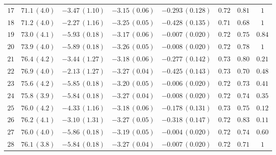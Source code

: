 \begin{center}
\begin{longtable}{@{\extracolsep{\fill}}cccccccc@{}}

$17$ &$ 71.1\,(4.0)$ & $-3.47\,(1.10)$& $-3.15\,(0.06)$& $-0.293\,(0.128)$ & $ 0.72 $ & $ 0.81 $ & $1 $ \\

$18$ &$ 71.2\,(4.0)$ & $-2.27\,(1.16)$& $-3.25\,(0.05)$& $-0.428\,(0.135)$ & $ 0.71 $ & $ 0.68 $ & $ 1$ \\

$19$ &$73.0\,(4.1)$ & $-5.93\,(0.18)$& $-3.17\,(0.06)$& $-0.007\,(0.020)$ & $ 0.72 $ & $ 0.75 $ & $ 0.84 $ \\

$20$ &$73.9\,(4.0)$ & $-5.89\,(0.18)$& $-3.26\,(0.05)$& $-0.008\,(0.020)$ & $ 0.72 $ & $ 0.78$ & $1 $ \\


$21$ & $76.4\,(4.2)$&$-3.44\,(1.27)$ &$-3.18\,(0.06) $ &$-0.277\,(0.142) $ & $ 0.73 $ & $ 0.80 $ & $ 0.21 $\\
 
$22$ & $76.9\,(4.0)$&$-2.13\,(1.27)$ &$-3.27\,(0.04) $ &$-0.425\,(0.143) $ & $ 0.73 $ & $ 0.70 $ & $ 0.48 $\\
 
$23$ &$75.6\,(4.2)$ &$-5.85\,(0.18)$ &$-3.20\,(0.05) $ &$-0.006\,(0.020) $ & $ 0.72 $ & $ 0.73 $ & $ 0.41 $\\

$24$ &$75.8\,(3.9)$ &$-5.84\,(0.18)$ &$-3.27\,(0.04) $ &$-0.008\,(0.020) $ & $ 0.72 $ & $ 0.74 $ & $ 0.35 $\\


$25$ & $76.0\,(4.2)$ &$-4.33\,(1.16)$ &$-3.18\,(0.06) $ &$-0.178\,(0.131) $ & $0.73 $ & $0.75 $ & $ 0.12$\\

$26$ & $76.2\,(4.1)$ &$-3.10\,(1.31)$ &$-3.27\,(0.05) $ &$-0.318\,(0.147) $ & $ 0.72$ & $0.83 $ & $ 0.11$\\
 
$27$ &$76.0\,(4.0)$ &$-5.86\,(0.18)$ &$-3.19\,(0.05) $ &$-0.004\,(0.020) $ & $0.72 $ & $0.74 $ & $ 0.60$\\

$28$ &$76.1\,(3.8)$ &$-5.84\,(0.18)$ &$-3.27\,(0.04) $ &$-0.007\,(0.020) $ & $0.72 $ & $ 0.71$ & $1 $\\



\end{longtable}
\end{center}
